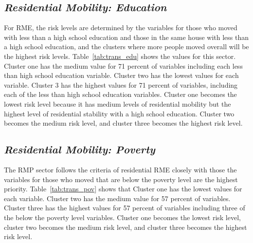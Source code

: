 

\subsection{\textit{Residential Mobility: Education}}

For RME, the risk levels are determined by the variables for those who moved with less than a high school education and those in the same house with less than a high school education, and the clusters where more people moved overall will be the highest risk levels. Table~\ref{tab:trans_edu} shows the values for this sector. Cluster one has the medium value for 71 percent of variables including each less than high school education variable. Cluster two has the lowest values for each variable. Cluster 3 has the highest values for 71 percent of variables, including each of the less than high school education variables. Cluster one becomes the lowest risk level because it has medium levels of residential mobility but the highest level of residential stability with a high school education. Cluster two becomes the medium risk level, and cluster three becomes the highest risk level. 




\subsection{\textit{Residential Mobility: Poverty}}

The RMP sector follows the criteria of residential RME closely with those the variables for those who moved that are below the poverty level are the highest priority. Table~\ref{tab:trans_pov} shows that Cluster one has the lowest values for each variable. Cluster two has the medium value for 57 percent of variables. Cluster three has the highest values for 57 percent of variables including three of the below the poverty level variables. Cluster one becomes the lowest risk level, cluster two becomes the medium risk level, and cluster three becomes the highest risk level. 




